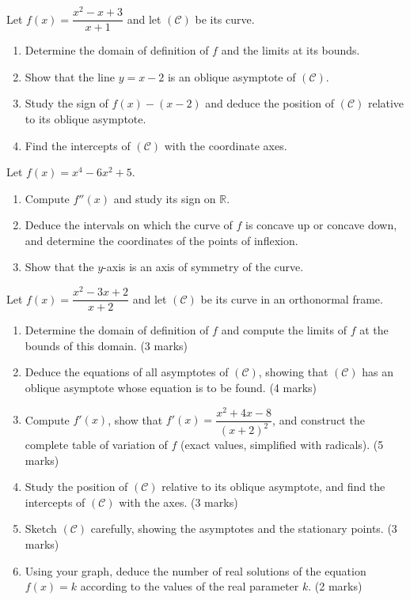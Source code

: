 \documentclass[11pt]{article}
\newcounter{popsec}
\newcounter{popsub}
\newcommand{\courssub}[1]{%
  \stepcounter{popsub}%
  \par\vspace{9pt}\noindent{\popxbold\fontsize{11.5}{13}\selectfont\color{popink}{\color{poporange}\thepopsec.\thepopsub}\hspace{6pt}#1}\par\nopagebreak\vspace{4pt}
}
\begin{document}
\begin{exercice}
Let $f(x)=\dfrac{x^{2}-x+3}{x+1}$ and let $(\mathcal{C})$ be its curve.
\begin{enumerate}
\item Determine the domain of definition of $f$ and the limits at its bounds.
\item Show that the line $y=x-2$ is an oblique asymptote of $(\mathcal{C})$.
\item Study the sign of $f(x)-(x-2)$ and deduce the position of $(\mathcal{C})$ relative to its oblique asymptote.
\item Find the intercepts of $(\mathcal{C})$ with the coordinate axes.
\end{enumerate}
\end{exercice}

\begin{exercice}
Let $f(x)=x^{4}-6x^{2}+5$.
\begin{enumerate}
\item Compute $f''(x)$ and study its sign on $\mathbb{R}$.
\item Deduce the intervals on which the curve of $f$ is concave up or concave down, and determine the coordinates of the points of inflexion.
\item Show that the $y$-axis is an axis of symmetry of the curve.
\end{enumerate}
\end{exercice}

\courssub{I prepare for the GCE}

\begin{exercice}
Let $f(x)=\dfrac{x^{2}-3x+2}{x+2}$ and let $(\mathcal{C})$ be its curve in an orthonormal frame.
\begin{enumerate}
\item Determine the domain of definition of $f$ and compute the limits of $f$ at the bounds of this domain. \hfill(3 marks)
\item Deduce the equations of all asymptotes of $(\mathcal{C})$, showing that $(\mathcal{C})$ has an oblique asymptote whose equation is to be found. \hfill(4 marks)
\item Compute $f'(x)$, show that $f'(x)=\dfrac{x^{2}+4x-8}{(x+2)^{2}}$, and construct the complete table of variation of $f$ (exact values, simplified with radicals). \hfill(5 marks)
\item Study the position of $(\mathcal{C})$ relative to its oblique asymptote, and find the intercepts of $(\mathcal{C})$ with the axes. \hfill(3 marks)
\item Sketch $(\mathcal{C})$ carefully, showing the asymptotes and the stationary points. \hfill(3 marks)
\item Using your graph, deduce the number of real solutions of the equation $f(x)=k$ according to the values of the real parameter $k$. \hfill(2 marks)
\end{enumerate}
\end{exercice}
\end{document}
